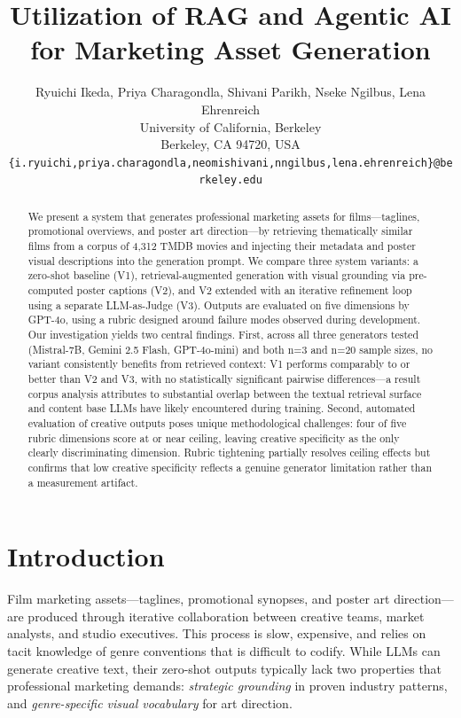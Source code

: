 \documentclass[10pt,twocolumn]{article}
\title{\Large Utilization of RAG and Agentic AI\\for Marketing Asset Generation}
\author{
  Ryuichi Ikeda, Priya Charagondla, Shivani Parikh, Nseke Ngilbus, Lena Ehrenreich \\
  University of California, Berkeley \\
  Berkeley, CA 94720, USA \\
  \texttt{\{i.ryuichi,priya.charagondla,neomishivani,nngilbus,lena.ehrenreich\}@berkeley.edu}
}
\date{}
\begin{document}
\maketitle

\begin{abstract}
We present a system that generates professional marketing 
assets for films—taglines, promotional overviews, and poster 
art direction—by retrieving thematically similar films from a 
corpus of 4,312 TMDB movies and injecting their metadata and 
poster visual descriptions into the generation prompt. We 
compare three system variants: a zero-shot baseline (V1), 
retrieval-augmented generation with visual grounding via 
pre-computed poster captions (V2), and V2 extended with an 
iterative refinement loop using a separate LLM-as-Judge (V3). 
Outputs are evaluated on five dimensions by GPT-4o, using a 
rubric designed around failure modes observed during 
development. Our investigation yields two central findings. 
First, across all three generators tested (Mistral-7B, 
Gemini 2.5 Flash, GPT-4o-mini) and both n=3 and n=20 sample 
sizes, no variant consistently benefits from retrieved 
context: V1 performs comparably to or better than V2 and V3, 
with no statistically significant pairwise differences—a 
result corpus analysis attributes to substantial overlap 
between the textual retrieval surface and content base LLMs 
have likely encountered during training. Second, automated 
evaluation of creative outputs poses unique methodological 
challenges: four of five rubric dimensions score at or near 
ceiling, leaving creative specificity as the only clearly 
discriminating dimension. Rubric tightening partially 
resolves ceiling effects but confirms that low creative 
specificity reflects a genuine generator limitation rather 
than a measurement artifact.
\end{abstract}

\section{Introduction}

Film marketing assets---taglines, promotional synopses, and poster art direction---are produced through iterative collaboration between creative teams, market analysts, and studio executives. This process is slow, expensive, and relies on tacit knowledge of genre conventions that is difficult to codify. While LLMs can generate creative text, their zero-shot outputs typically lack two properties that professional marketing demands: \textit{strategic grounding} in proven industry patterns, and \textit{genre-specific visual vocabulary} for art direction.
\end{document}
